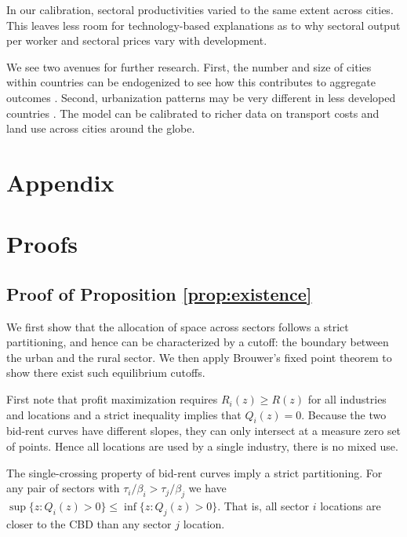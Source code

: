 \documentclass[12pt]{article}
\begin{document}
In our calibration, sectoral productivities varied to the same extent across cities. This leaves less room for technology-based explanations as to why sectoral output per worker and sectoral prices vary with development.

We see two avenues for further research. First, the number and size of cities within countries can be endogenized to see how this contributes to aggregate outcomes \cite{Desmet2013,Ramondo2016-qy}. Second, urbanization patterns may be very different in less developed countries \cite{Glaeser2014-gd,Harari2016-cx}. The model can be calibrated to richer data on transport costs and land use across cities around the globe.
\clearpage




\clearpage

\appendix
\section*{Appendix}
\section{Proofs}
\subsection{Proof of Proposition \ref{prop:existence}}
We first show that the allocation of space across sectors follows a strict partitioning, and hence can be characterized by a cutoff: the boundary between the urban and the rural sector. We then apply Brouwer's fixed point theorem to show there exist such equilibrium cutoffs.

First note that profit maximization requires $R_i(z)\ge R(z)$ for all industries and locations and a strict inequality implies that $Q_i(z)=0$. Because the two bid-rent curves have different slopes, they can only intersect at a measure zero set of points. Hence all locations are used by a single industry, there is no mixed use.

The single-crossing property of bid-rent curves imply a strict partitioning. For any pair of sectors with $\tau_i/\beta_i>\tau_j/\beta_j$ we have $\sup\{z: Q_i(z)>0\} \le \inf\{z: Q_j(z)>0\}$. That is, all sector $i$ locations are closer to the CBD than any sector $j$ location.
\end{document}
